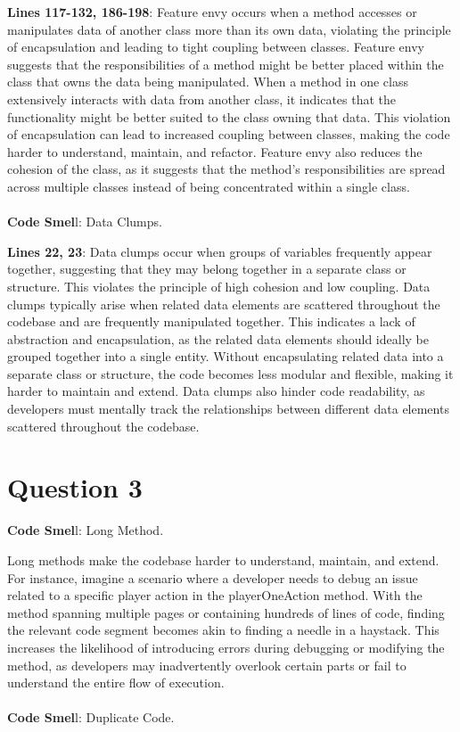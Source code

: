 \documentclass[12pt]{article}
\numberwithin{table}{section}
\begin{document}
 	\textbf{Lines 117-132, 186-198}: Feature envy occurs when a method accesses or manipulates data of another class more than its own data, violating the principle of encapsulation and leading to tight coupling between classes. Feature envy suggests that the responsibilities of a method might be better placed within the class that owns the data being manipulated. When a method in one class extensively interacts with data from another class, it indicates that the functionality might be better suited to the class owning that data. This violation of encapsulation can lead to increased coupling between classes, making the code harder to understand, maintain, and refactor. Feature envy also reduces the cohesion of the class, as it suggests that the method's responsibilities are spread across multiple classes instead of being concentrated within a single class.\\
 	\\
 	\textbf{Code Smel}l: Data Clumps.
 	
 	\textbf{Lines 22, 23}: Data clumps occur when groups of variables frequently appear together, suggesting that they may belong together in a separate class or structure. This violates the principle of high cohesion and low coupling. Data clumps typically arise when related data elements are scattered throughout the codebase and are frequently manipulated together. This indicates a lack of abstraction and encapsulation, as the related data elements should ideally be grouped together into a single entity. Without encapsulating related data into a separate class or structure, the code becomes less modular and flexible, making it harder to maintain and extend. Data clumps also hinder code readability, as developers must mentally track the relationships between different data elements scattered throughout the codebase.
 	
	\section*{Question 3}
	\textbf{Code Smel}l: Long Method.
	
	Long methods make the codebase harder to understand, maintain, and extend. For instance, imagine a scenario where a developer needs to debug an issue related to a specific player action in the playerOneAction method. With the method spanning multiple pages or containing hundreds of lines of code, finding the relevant code segment becomes akin to finding a needle in a haystack. This increases the likelihood of introducing errors during debugging or modifying the method, as developers may inadvertently overlook certain parts or fail to understand the entire flow of execution.\\
	\\
	\textbf{Code Smel}l: Duplicate Code.
	
\end{document}

